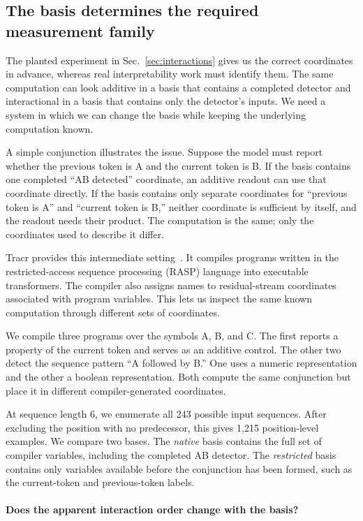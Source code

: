 \documentclass[sigconf,10pt,nonacm,balance=false]{acmart}
\begin{document}
\subsection{The basis determines the required measurement family}\label{sec:basis}

The planted experiment in Sec.~\ref{sec:interactions} gives us the correct coordinates in advance, whereas real interpretability work must identify them. The same computation can look additive in a basis that contains a completed detector and interactional in a basis that contains only the detector's inputs. We need a system in which we can change the basis while keeping the underlying computation known.

A simple conjunction illustrates the issue. Suppose the model must report whether the previous token is A and the current token is B. If the basis contains one completed ``AB detected'' coordinate, an additive readout can use that coordinate directly. If the basis contains only separate coordinates for ``previous token is A'' and ``current token is B,'' neither coordinate is sufficient by itself, and the readout needs their product. The computation is the same; only the coordinates used to describe it differ.

Tracr provides this intermediate setting~\cite{lindner2023tracr}. It compiles programs written in the restricted-access sequence processing (RASP) language into executable transformers. The compiler also assigns names to residual-stream coordinates associated with program variables. This lets us inspect the same known computation through different sets of coordinates.

We compile three programs over the symbols A, B, and C. The first reports a property of the current token and serves as an additive control. The other two detect the sequence pattern ``A followed by B.'' One uses a numeric representation and the other a boolean representation. Both compute the same conjunction but place it in different compiler-generated coordinates.

At sequence length 6, we enumerate all 243 possible input sequences. After excluding the position with no predecessor, this gives 1,215 position-level examples. We compare two bases. The \emph{native} basis contains the full set of compiler variables, including the completed AB detector. The \emph{restricted} basis contains only variables available before the conjunction has been formed, such as the current-token and previous-token labels.

\paragraph{Does the apparent interaction order change with the basis?}
\end{document}
